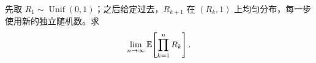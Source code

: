 先取 $R_1\sim\operatorname{Unif}(0,1)$；之后给定过去，$R_{k+1}$ 在 $(R_k,1)$ 上均匀分布，每一步使用新的独立随机数。求
\[
\lim_{n\to\infty}\mathbb{E}\!\left[\prod_{k=1}^nR_k\right].
\]

